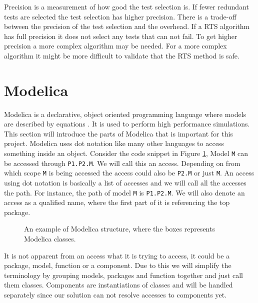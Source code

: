\documentclass{cslthse-msc}
\begin{document}
Precision is a measurement of how good the test selection is. \cite{DBLP:conf/sigsoft/LegunsenHSLZM16} If fewer redundant tests are selected the test selection has higher precision. There is a trade-off between the precision of the test selection and the overhead. If a RTS algorithm has full precision it does not select any tests that can not fail. To get higher precision a more complex algorithm may be needed. For a more complex algorithm it might be more difficult to validate that the RTS method is safe.

\section{Modelica}
Modelica is a declarative, object oriented programming language where models are described by equations \cite{modelicamodelica}. It is used to perform high performance simulations. This section will introduce the parts of Modelica that is important for this project.
Modelica uses dot notation like many other languages to access something inside an object. Consider the code snippet in Figure \ref{fig:modelicaExample}, Model \texttt{M} can be accessed through \texttt{P1.P2.M}. We will call this an access. Depending on from which scope \texttt{M} is being accessed the access could also be \texttt{P2.M} or just \texttt{M}. An access using dot notation is basically a list of accesses and we will call all the accesses the path. For instance, the path of model \texttt{M} is \texttt{P1.P2.M}. We will also denote an access as a qualified name, where the first part of it is referencing the top package.

\begin{figure}[!htbp]
    \centering
    \qquad
    \subfloat{\raisebox{3.2 cm}{}}
    \caption{An example of Modelica structure, where the boxes represents Modelica classes.}
    \label{fig:modelicaExample}
\end{figure}

It is not apparent from an access what it is trying to access, it could be a package, model, function or a component. Due to this we will simplify the terminology by grouping models, packages and function together and just call them classes. Components are instantiations of classes and will be handled separately since our solution can not resolve accesses to components yet.
\end{document}
